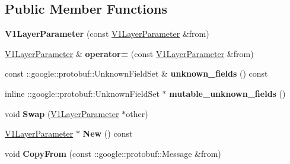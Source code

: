 \subsection*{Public Member Functions}
\begin{DoxyCompactItemize}
\item 
\mbox{\label{classcaffe_1_1_v1_layer_parameter_a699a722645235ab060a5ce99691f8abc}} 
{\bfseries V1\+Layer\+Parameter} (const \mbox{\hyperlink{classcaffe_1_1_v1_layer_parameter}{V1\+Layer\+Parameter}} \&from)
\item 
\mbox{\label{classcaffe_1_1_v1_layer_parameter_ab47fe5306dd0c5fe575b14f3f737c4c7}} 
\mbox{\hyperlink{classcaffe_1_1_v1_layer_parameter}{V1\+Layer\+Parameter}} \& {\bfseries operator=} (const \mbox{\hyperlink{classcaffe_1_1_v1_layer_parameter}{V1\+Layer\+Parameter}} \&from)
\item 
\mbox{\label{classcaffe_1_1_v1_layer_parameter_a622a93ddbe3bf5a872a3d9288780b49d}} 
const \+::google\+::protobuf\+::\+Unknown\+Field\+Set \& {\bfseries unknown\+\_\+fields} () const
\item 
\mbox{\label{classcaffe_1_1_v1_layer_parameter_acadc5d75e2d2d18df6553e8abec0b496}} 
inline \+::google\+::protobuf\+::\+Unknown\+Field\+Set $\ast$ {\bfseries mutable\+\_\+unknown\+\_\+fields} ()
\item 
\mbox{\label{classcaffe_1_1_v1_layer_parameter_acab8164c3397503af61f75dcd81c4268}} 
void {\bfseries Swap} (\mbox{\hyperlink{classcaffe_1_1_v1_layer_parameter}{V1\+Layer\+Parameter}} $\ast$other)
\item 
\mbox{\label{classcaffe_1_1_v1_layer_parameter_af27723387c9b244ba3c0b783b5630b9d}} 
\mbox{\hyperlink{classcaffe_1_1_v1_layer_parameter}{V1\+Layer\+Parameter}} $\ast$ {\bfseries New} () const
\item 
\mbox{\label{classcaffe_1_1_v1_layer_parameter_a001cfb72d3029c03a8713cb241bde8e1}} 
void {\bfseries Copy\+From} (const \+::google\+::protobuf\+::\+Message \&from)
\item 

\end{DoxyCompactItemize}
